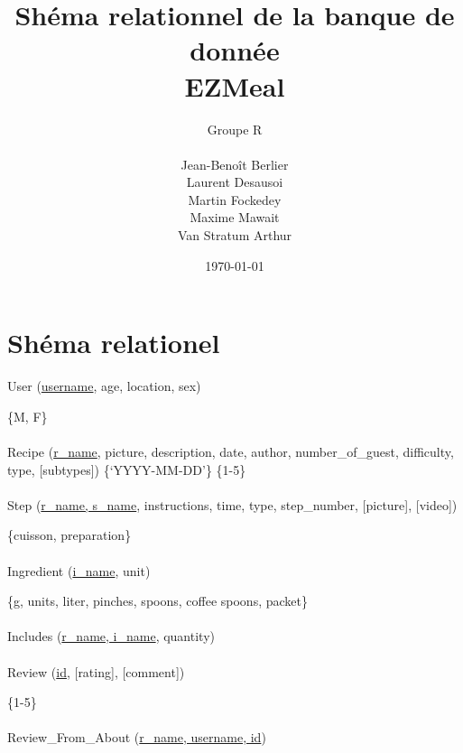 \documentclass[a4paper,10pt]{article}
\title{Shéma relationnel de la banque de donnée\\ EZMeal}
\author{Groupe R\\ \\Jean-Benoît Berlier\\Laurent Desausoi \\ Martin Fockedey \\Maxime Mawait \\Van Stratum Arthur
}
\date{\today}
\begin{document}
\begin{titlepage}
\begin{figure}[t]
\end{figure}

\maketitle 
\end{titlepage}



\section*{Shéma relationel}

\begin{changemargin}{-0.5in}{-0.5in} 
  



User (\underline{username}, age, location, sex)\par
			 
         \noindent\hspace{1.73in} \{M, F\} \\\\

Recipe (\underline{r\_name}, picture, description, date, author, number\_of\_guest, difficulty, type, [subtypes]) \noindent\hspace{0.8in} \{‘YYYY-MM-DD’\}\noindent\hspace{1.4in} \{1-5\} \\\\

Step (\underline{r\_name, s\_name}, instructions, time, type, step\_number, [picture], [video])\par
\noindent\hspace{2.0in} \{cuisson, preparation\} \\\\

Ingredient (\underline{i\_name}, unit) \par
\noindent\hspace{-0.18in} \{g, units, liter, pinches, spoons, coffee spoons, packet\} \\\\

Includes (\underline{r\_name, i\_name}, quantity)\\\\


Review (\underline{id}, [rating], [comment]) \par
 \noindent\hspace{0.74in} \{1-5\} \\\\

Review\_From\_About (\underline{r\_name, username, id})
\end{changemargin}
\end{document}
